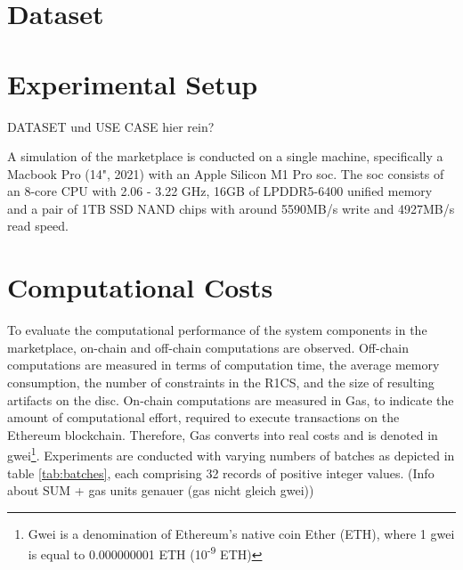 
    
    





\section{Dataset}

\newcommand\inch{\mbox{''}} 

\section{Experimental Setup}

DATASET und USE CASE hier rein?

A simulation of the marketplace is conducted on a single machine, specifically a Macbook Pro (14", 2021) with an Apple Silicon M1 Pro \acrfull{soc}. The \acrshort{soc} consists of an 8-core CPU with 2.06 - 3.22 GHz, 16GB of LPDDR5-6400 unified memory and a pair of 1TB SSD NAND chips with around 5590MB/s write and 4927MB/s read speed.

\section{Computational Costs}

To evaluate the computational performance of the system components in the marketplace, on-chain and off-chain computations are observed. Off-chain computations are measured in terms of computation time, the average memory consumption, the number of constraints in the R1CS, and the size of resulting artifacts on the disc. On-chain computations are measured in Gas, to indicate the amount of computational effort, required to execute transactions on the Ethereum blockchain. Therefore, Gas converts into real costs and is denoted in gwei\footnote{Gwei is a denomination of Ethereum's native coin Ether (ETH), where 1 gwei is equal to 0.000000001 ETH (10\textsuperscript{-9} ETH)}. Experiments are conducted with varying numbers of batches as depicted in table \ref{tab:batches}, each comprising 32 records of positive integer values. (Info about SUM + gas units genauer (gas nicht gleich gwei))


